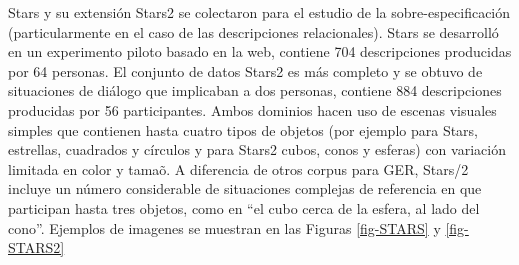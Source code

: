 \label{sec:corpusSTARS}
Stars \cite{stars-mutual-disamb} y su extensi\'on Stars2 se colectaron para el estudio de la sobre-especificaci\'on (particularmente en el caso de las descripciones relacionales). Stars se desarroll\'o en un experimento piloto basado en la web, contiene 704 descripciones producidas por 64 personas. El conjunto de datos Stars2 es m\'as completo y se obtuvo de situaciones de di\'alogo que implicaban a dos personas, contiene 884 descripciones producidas por 56 participantes. Ambos dominios hacen uso de escenas visuales simples que contienen hasta cuatro tipos de objetos (por ejemplo para Stars, estrellas, cuadrados y c\'irculos y para Stars2 cubos, conos y esferas) con variaci\'on limitada en color y tama\~o. A diferencia de otros corpus para GER, Stars/2 incluye un n\'umero considerable de situaciones complejas de referencia en que participan hasta tres objetos, como en ``el cubo cerca de la esfera, al lado del cono''. Ejemplos de imagenes se muestran en las Figuras \ref{fig-STARS} y \ref{fig-STARS2}


